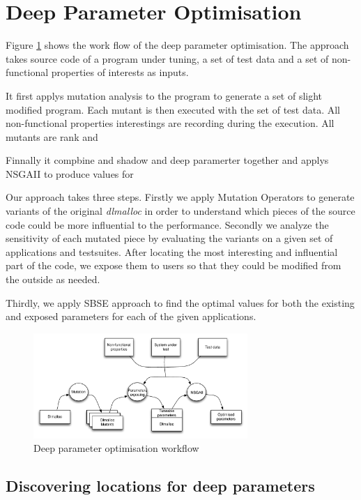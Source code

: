 \section{Deep Parameter Optimisation}

Figure \ref{system} shows the work flow of the deep parameter optimisation. The approach takes source code of a program under tuning, a set of test data and a set of non-functional properties of interests as inputs. 


It first applys mutation analysis to the program to generate a set of slight modified program. Each mutant is then executed with the set of test data.  All non-functional properties interestings are recording during the execution. All mutants are rank and 

Finnally it compbine and shadow and deep paramerter together and applys NSGAII to produce values for



Our approach takes three steps. Firstly we apply Mutation Operators to generate variants of the original \emph{dlmalloc} in order to understand which pieces of the source code could be more influential to the performance. Secondly we analyze the sensitivity of each mutated piece by evaluating the variants on a given set of applications and testsuites. After locating the most interesting and influential part of the code, we expose them to users so that they could be modified from the outside as needed. 

Thirdly, we apply SBSE approach to find the optimal values for both the existing and exposed parameters for each of the given applications.

\begin{figure}[htbp]
\centering
\includegraphics[width=3.2in]{pics/system}
\caption{Deep parameter optimisation workflow}\label{system}
\end{figure}


\subsection{Discovering locations for deep parameters}

